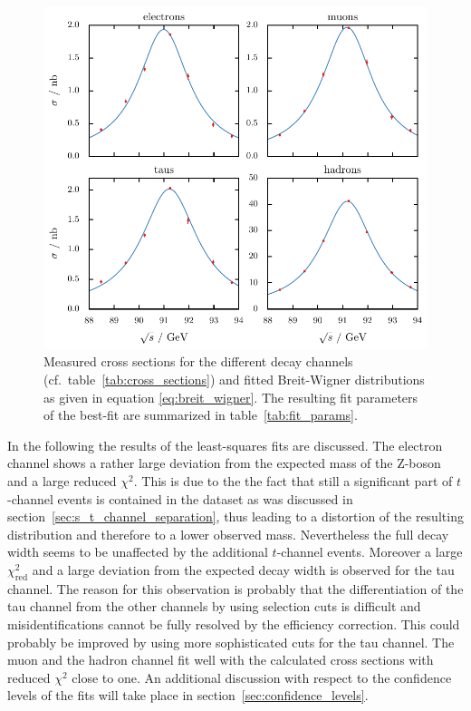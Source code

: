 \documentclass[11pt, a4paper]{article}
\numberwithin{equation}{section}
\begin{document}
\begin{figure}[tb]
	\centering
	\includegraphics{./figures/cross_sections.pdf}
	\caption{Measured cross sections for the different decay channels (cf.\ table~\ref{tab:cross_sections}) and fitted Breit-Wigner distributions as given in equation \eqref{eq:breit_wigner}. The resulting fit parameters of the best-fit are summarized in table~\ref{tab:fit_params}.}
	\label{fig:cross_section_fit}
\end{figure}

In the following the results of the least-squares fits are discussed.
The electron channel shows a rather large deviation from the expected mass of the Z-boson and a large reduced $\chi^2$.
This is due to the the fact that still a significant part of $t$-channel events is contained in the dataset as was discussed in section~\ref{sec:s_t_channel_separation}, thus leading to a distortion of the resulting distribution and therefore to a lower observed mass.
Nevertheless the full decay width seems to be unaffected by the additional $t$-channel events.
Moreover a large $\chi_\mathrm{red}^2$ and a large deviation from the expected decay width is observed for the tau channel.
The reason for this observation is probably that the differentiation of the tau channel from the other channels by using selection cuts is difficult and misidentifications cannot be fully resolved by the efficiency correction.
This could probably be improved by using more sophisticated cuts for the tau channel.
The muon and the hadron channel fit well with the calculated cross sections with reduced $\chi^2$ close to one.
An additional discussion with respect to the confidence levels of the fits will take place in section~\ref{sec:confidence_levels}.
\end{document}

